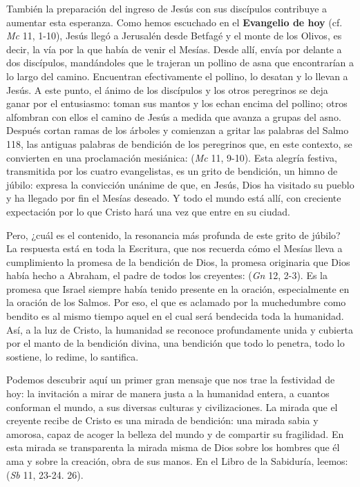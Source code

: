\begin{body}
También la preparación del ingreso de Jesús con sus discípulos contribuye a aumentar esta esperanza. Como hemos escuchado en el \textbf{Evangelio de hoy} (cf. \textit{Mc} 11, 1-10), Jesús llegó a Jerusalén desde Betfagé y el monte de los Olivos, es decir, la vía por la que había de venir el Mesías. Desde allí, envía por delante a dos discípulos, mandándoles que le trajeran un pollino de asna que encontrarían a lo largo del camino. Encuentran efectivamente el pollino, lo desatan y lo llevan a Jesús. A este punto, el ánimo de los discípulos y los otros peregrinos se deja ganar por el entusiasmo: toman sus mantos y los echan encima del pollino; otros alfombran con ellos el camino de Jesús a medida que avanza a grupas del asno. Después cortan ramas de los árboles y comienzan a gritar las palabras del Salmo 118, las antiguas palabras de bendición de los peregrinos que, en este contexto, se convierten en una proclamación mesiánica:  (\textit{Mc} 11, 9-10). Esta alegría festiva, transmitida por los cuatro evangelistas, es un grito de bendición, un himno de júbilo: expresa la convicción unánime de que, en Jesús, Dios ha visitado su pueblo y ha llegado por fin el Mesías deseado. Y todo el mundo está allí, con creciente expectación por lo que Cristo hará una vez que entre en su ciudad.

Pero, ¿cuál es el contenido, la resonancia más profunda de este grito de júbilo? La respuesta está en toda la Escritura, que nos recuerda cómo el Mesías lleva a cumplimiento la promesa de la bendición de Dios, la promesa originaria que Dios había hecho a Abraham, el padre de todos los creyentes:  (\textit{Gn} 12, 2-3). Es la promesa que Israel siempre había tenido presente en la oración, especialmente en la oración de los Salmos. Por eso, el que es aclamado por la muchedumbre como bendito es al mismo tiempo aquel en el cual será bendecida toda la humanidad. Así, a la luz de Cristo, la humanidad se reconoce profundamente unida y cubierta por el manto de la bendición divina, una bendición que todo lo penetra, todo lo sostiene, lo redime, lo santifica.

Podemos descubrir aquí un primer gran mensaje que nos trae la festividad de hoy: la invitación a mirar de manera justa a la humanidad entera, a cuantos conforman el mundo, a sus diversas culturas y civilizaciones. La mirada que el creyente recibe de Cristo es una mirada de bendición: una mirada sabia y amorosa, capaz de acoger la belleza del mundo y de compartir su fragilidad. En esta mirada se transparenta la mirada misma de Dios sobre los hombres que él ama y sobre la creación, obra de sus manos. En el Libro de la Sabiduría, leemos:  (\textit{Sb} 11, 23-24. 26).


\end{body}
